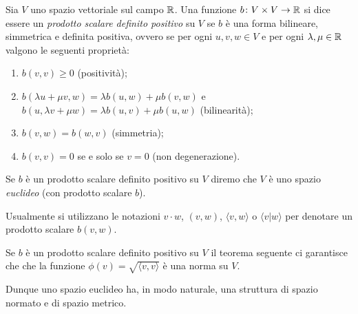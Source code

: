 \begin{definition}
\label{def:prodotto_scalare}%
Sia $V$ uno spazio vettoriale sul campo ${\mathbb R}$.
Una funzione $b\colon V\times V \to {\mathbb R}$ si dice
essere un \emph{prodotto scalare definito positivo}%
%
%
su $V$ se
$b$ è una forma bilineare, simmetrica e definita
positiva, ovvero se
per ogni $u,v,w\in V$ e per ogni $\lambda, \mu \in {\mathbb R}$
valgono le seguenti proprietà:
\begin{enumerate}
\item $b(v,v) \ge 0$ (positività);
\item $b(\lambda u + \mu v, w) = \lambda b(u,w) + \mu b(v,w)$
e $b(u,\lambda v+ \mu w) = \lambda b(u,v) + \mu b(u,w)$
(bilinearità);
\item $b(v,w) = b(w,v)$ (simmetria);
\item $b(v,v) = 0$ se e solo se $v=0$ (non degenerazione).
\end{enumerate}

Se $b$ è un prodotto scalare definito positivo su $V$ diremo che $V$ è uno
spazio \emph{euclideo} (con prodotto scalare $b$).

Usualmente si utilizzano le notazioni $v\cdot w$, $(v,w)$, $\langle v,w\rangle$
o $\langle v \vert w\rangle$ per denotare un prodotto scalare $b(v,w)$.
\end{definition}

Se $b$ è un prodotto scalare definito positivo su $V$ il teorema seguente ci garantisce che
che la funzione $\phi(v) = \sqrt{\langle v,v\rangle}$ è una norma su $V$.

Dunque uno spazio euclideo ha, in modo naturale, una struttura di spazio
normato e di spazio metrico.

